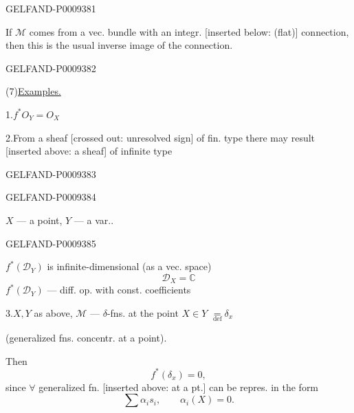 \begin{GelfandAdjacentEvidence}{GELFAND-P000938}{1}

If $\mathcal M$ comes from a vec. bundle with an integr. [inserted below: (flat)] connection, then this is the usual inverse image of the connection.
\end{GelfandAdjacentEvidence}
\begin{GelfandAdjacentEvidence}{GELFAND-P000938}{2}


(7)\quad \underline{Examples.}

1.\enspace $f^*O_Y=O_X$

2.\enspace From a sheaf [crossed out: unresolved sign] of fin. type there may result [inserted above: a sheaf] of infinite type
\end{GelfandAdjacentEvidence}
\begin{GelfandAdjacentEvidence}{GELFAND-P000938}{3}

\end{GelfandAdjacentEvidence}
\begin{GelfandAdjacentEvidence}{GELFAND-P000938}{4}


$X$ --- a point, $Y$ --- a var..
\end{GelfandAdjacentEvidence}
\begin{GelfandAdjacentEvidence}{GELFAND-P000938}{5}


$f^*(\mathcal D_Y)$ is infinite-dimensional (as a vec. space)
\[
 \mathcal D_X=\mathbb C
\]
$f^*(\mathcal D_Y)$ --- diff. op. with const. coefficients

3.\enspace $X,Y$ as above, $\mathcal M$ --- $\delta$-fns. at the point $X\in Y$
$\underset{\mathrm{def}}{=}\delta_x$

(generalized fns. concentr. at a point).

Then
\[
 f^*(\delta_x)=0,
\]
since $\forall$ generalized fn. [inserted above: at a pt.] can be repres. in the form
\[
 \sum \alpha_i s_i,\qquad \alpha_i(X)=0.
\]
\end{GelfandAdjacentEvidence}
